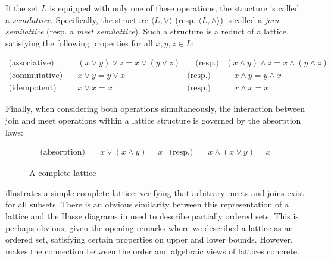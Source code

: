 If the set $L$ is equipped with only one of these operations, the structure is called a \textit{semilattice}. Specifically, the structure $\langle L, \vee \rangle$ (resp. $\langle L, \wedge \rangle$) is called a \textit{join semilattice} (resp. a \textit{meet semilattice}). Such a structure is a reduct of a lattice, satisfying the following properties for all $x, y, z \in L$:

\vspace{-1em}
\begin{align}
  \text{(associative)} & \quad (x \vee y) \vee z = x \vee (y \vee z) & \quad \text{(resp.)} & (x \wedge y) \wedge z = x \wedge (y \wedge z) \\
  \text{(commutative)} & \quad x \vee y = y \vee x & \text{(resp.)}  & \quad x \wedge y = y \wedge x \\
  \text{(idempotent)}  & \quad x \vee x = x & \text{(resp.)}  & \quad x \wedge x = x
\end{align}

Finally, when considering both operations simultaneously, the interaction between join and meet operations within a lattice structure is governed by the absorption laws:

\vspace{-1em}
\begin{align}
  \text{(absorption)} & \quad x \vee (x \wedge y) = x & \text{(resp.)}  & \quad x \wedge (x \vee y) = x
\end{align}

\begin{figure}[H]
  \centering
  \caption{A complete lattice}
  \label{figure:complete-lattice}
\end{figure}

 illustrates a simple complete lattice; verifying that arbitrary meets and joins exist for all subsets. There is an obvious similarity between this representation of a lattice and the Hasse diagrams in  used to describe partially ordered sets. This is perhaps obvious, given the opening remarks where we described a lattice as an ordered set, satisfying certain properties on upper and lower bounds. However,  makes the connection between the order and algebraic views of lattices concrete.

